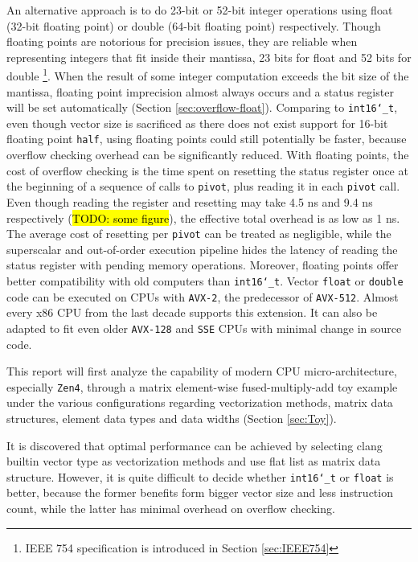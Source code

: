 \documentclass[logo,bsc,singlespacing,parskip]{infthesis}
\newcommand{\dtshort}{\texttt{int16\char`_t}}
\newcommand{\dtfloat}{\texttt{float}}
\newcommand{\dtdouble}{\texttt{double}}
\newcommand{\pivot}{\texttt{pivot}}
\begin{document}
An alternative approach is to do 23-bit or 52-bit integer operations using float
(32-bit floating point) or double (64-bit floating point) respectively. Though
floating points are notorious for precision issues, they are reliable when
representing integers that fit inside their mantissa, 23 bits for float and 52
bits for double \footnote{ IEEE 754 specification is introduced in Section
\ref{sec:IEEE754}}. When the result of some integer computation exceeds the bit
size of the mantissa, floating point imprecision almost always occurs and a
status register will be set automatically (Section \ref{sec:overflow-float}).
Comparing to \dtshort{}, even though vector size is sacrificed as there does not
exist support for 16-bit floating point \texttt{half}, using floating points
could still potentially be faster, because overflow checking overhead can be
significantly reduced. With floating points, the cost of overflow checking is
the time spent on resetting the status register once at the beginning of a
sequence of calls to \pivot{}, plus reading it in each \pivot{} call. Even
though reading the register and resetting may take 4.5 ns and 9.4 ns
respectively (\hl{TODO: some figure}), the effective total overhead is as low as
1 ns. The average cost of resetting per \pivot{} can be treated as negligible,
while the superscalar and out-of-order execution pipeline hides the latency of
reading the status register with pending memory operations. Moreover, floating
points offer better compatibility with old computers than \dtshort{}. Vector
\dtfloat{} or \dtdouble{} code can be executed on CPUs with \texttt{AVX-2}, the
predecessor of \texttt{AVX-512}. Almost every x86 CPU from the last decade
supports this extension. It can also be adapted to fit even older
\texttt{AVX-128} and \texttt{SSE} CPUs with minimal change in source code.

This report will first analyze the capability of modern CPU micro-architecture,
especially \texttt{Zen4}, through a matrix element-wise fused-multiply-add toy
example under the various configurations regarding vectorization methods, matrix
data structures, element data types and data widths (Section \ref{sec:Toy}). 

It is discovered that optimal performance can be achieved by selecting clang
builtin vector type as vectorization methods and use flat list as matrix data
structure. However, it is quite difficult to decide whether \dtshort{} or
\dtfloat{} is better, because the former benefits form bigger vector size
and less instruction count, while the latter has minimal overhead on overflow
checking. 
\end{document}

